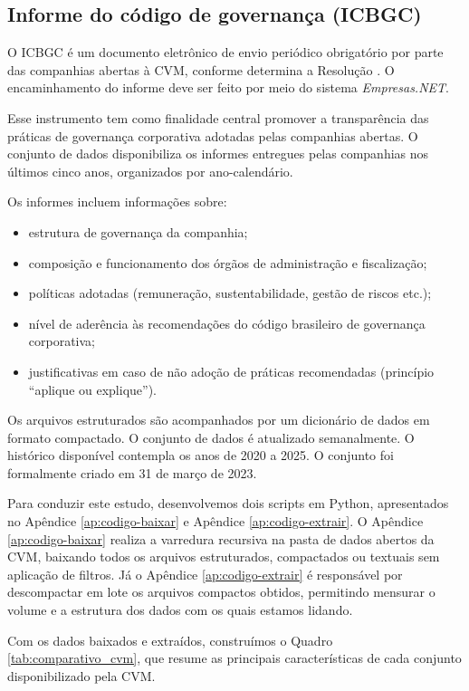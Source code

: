 \documentclass[recuosum=1.5cm]{iftex2024}
\begin{document}
\subsection{Informe do código de governança (ICBGC)}
O ICBGC é um documento eletrônico de envio periódico obrigatório por parte das companhias abertas à CVM, conforme determina a Resolução \citet{cvm:2022:resolucao}. O encaminhamento do informe deve ser feito por meio do sistema \textit{Empresas.NET}.

Esse instrumento tem como finalidade central promover a transparência das práticas de governança corporativa adotadas pelas companhias abertas. O conjunto de dados disponibiliza os informes entregues pelas companhias nos últimos cinco anos, organizados por ano-calendário.

Os informes incluem informações sobre:

\begin{itemize}
	\item estrutura de governança da companhia;
	\item composição e funcionamento dos órgãos de administração e fiscalização;
	\item políticas adotadas (remuneração, sustentabilidade, gestão de riscos etc.);
	\item nível de aderência às recomendações do código brasileiro de governança corporativa;
	\item justificativas em caso de não adoção de práticas recomendadas (princípio “aplique ou explique”).
\end{itemize}

Os arquivos estruturados são acompanhados por um dicionário de dados em formato compactado. O conjunto de dados é atualizado semanalmente. O histórico disponível contempla os anos de 2020 a 2025. O conjunto foi formalmente criado em 31 de março de 2023. 

Para conduzir este estudo, desenvolvemos dois scripts em Python, apresentados no Apêndice \ref{ap:codigo-baixar}
e Apêndice \ref{ap:codigo-extrair}. O Apêndice \ref{ap:codigo-baixar} realiza a varredura recursiva na pasta de dados abertos da CVM, baixando todos os arquivos estruturados, compactados ou textuais sem aplicação de filtros. Já o Apêndice \ref{ap:codigo-extrair} é responsável por descompactar em lote os arquivos compactos obtidos, permitindo mensurar o volume e a estrutura dos dados com os quais estamos lidando.

Com os dados baixados e extraídos, construímos o Quadro \ref{tab:comparativo_cvm}, que resume as principais características de cada conjunto disponibilizado pela CVM.
\end{document}
